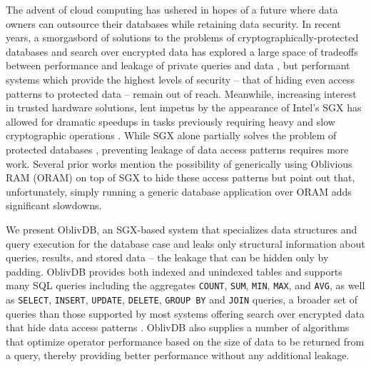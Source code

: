 \documentclass[conference]{IEEEtran}
\def\name/{OblivDB}
\begin{document}
The advent of cloud computing has ushered in hopes of a future where data owners can outsource their databases while retaining data security. In recent years, a smorgasbord of solutions to the problems of cryptographically-protected databases and search over encrypted data has explored a large space of tradeoffs between performance and leakage of private queries and data \cite{FVY+17}, but performant systems which provide the highest levels of security -- that of hiding even access patterns to protected data -- remain out of reach. Meanwhile, increasing interest in trusted hardware solutions, lent impetus by the appearance of Intel's SGX \cite{CD16} has allowed for dramatic speedups in tasks previously requiring heavy and slow cryptographic operations \cite{FVBG16, NFR+17}. While SGX alone partially solves the problem of protected databases \cite{FBB+17}, preventing leakage of data access patterns requires more work. Several prior works \cite{PBP16, DPP+16, FVY+17} mention the possibility of generically using Oblivious RAM (ORAM) on top of SGX to hide these access patterns but point out that, unfortunately, simply running a generic database application over ORAM adds significant slowdowns.

We present \name/, an SGX-based system that specializes data structures and query execution for the database case and leaks only structural information about queries, results, and stored data -- the leakage that can be hidden only by padding. \name/ provides both indexed and unindexed tables and supports many SQL queries including the aggregates \texttt{COUNT}, \texttt{SUM}, \texttt{MIN}, \texttt{MAX}, and \texttt{AVG}, as well as \texttt{SELECT}, \texttt{INSERT}, \texttt{UPDATE}, \texttt{DELETE}, \texttt{GROUP BY} and \texttt{JOIN} queries, a broader set of queries than those supported by most systems offering search over encrypted data that hide data access patterns \cite{FVY+17}. \name/ also supplies a number of algorithms that optimize operator performance based on the size of data to be returned from a query, thereby providing better performance without any additional leakage. 
\end{document}
